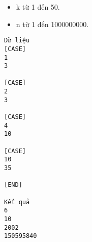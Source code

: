 \begin{itemize}
	\item     k từ 1 đến 50.   
	\item     n từ 1 đến 1000000000.   
\end{itemize}
\begin{verbatim}
Dữ liệu
[CASE]
1
3

[CASE]
2
3

[CASE]
4
10

[CASE]
10
35

[END]

Kết quả
6
10
2002
150595840
\end{verbatim}